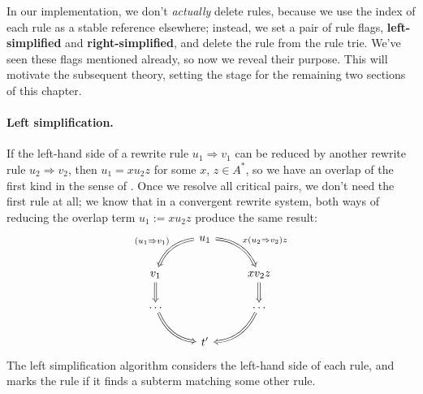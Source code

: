 \documentclass[../generics]{subfiles}
\begin{document}
In our implementation, we don't \emph{actually} delete rules, because we use the index of each rule as a stable reference elsewhere; instead, we set a pair of rule flags, \textbf{left-simplified} and \textbf{right-simplified}, and delete the rule from the rule trie. We've seen these flags mentioned already, so now we reveal their purpose. This will motivate the subsequent theory, setting the stage for the remaining two sections of this chapter.

\paragraph{Left simplification.} If the left-hand side of a rewrite rule $u_1\Rightarrow v_1$ can be reduced by another rewrite rule $u_2\Rightarrow v_2$, then $u_1=xu_2z$ for some $x$, $z\in A^*$, so we have an overlap of the first kind in the sense of . Once we resolve all critical pairs, we don't need the first rule at all; we know that in a convergent rewrite system, both ways of reducing the overlap term $u_1:=xu_2z$ produce the same result:
\[
\begin{tikzcd}
&u_1
\arrow[ld, Rightarrow, bend right, "(u_1\Rightarrow v_1)"']
\arrow[rd, Rightarrow, bend left, "x(u_2\Rightarrow v_2)z"]
\\
v_1\arrow[d, Rightarrow]&&xv_2z\arrow[d, Rightarrow]\\
\ldots\arrow[rd, Rightarrow, bend right]&&\ldots\arrow[ld, Rightarrow, bend left]\\
&t^\prime&
\end{tikzcd}
\]
The left simplification algorithm considers the left-hand side of each rule, and marks the rule if it finds a subterm matching some other rule.
\end{document}
